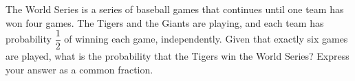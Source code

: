 The World Series is a series of baseball games that continues until one team has won four games. The Tigers and the Giants are playing, and each team has probability $\dfrac{1}{2}$ of winning each game, independently. Given that exactly six games are played, what is the probability that the Tigers win the World Series? Express your answer as a common fraction.
